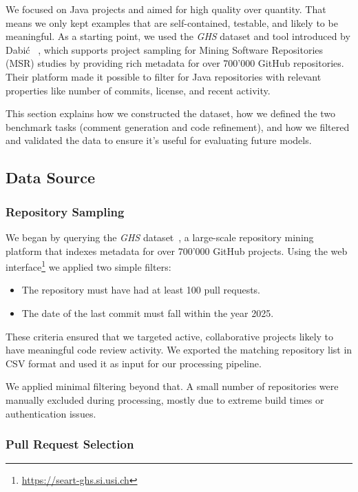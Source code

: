 We focused on Java projects and aimed for high quality over quantity. That means we only kept
examples that are self-contained, testable, and likely to be meaningful. As a starting point, we
used the \textit{GHS} dataset and tool introduced by Dabić \etal~\cite{Dabic:msr2021data}, which
supports project sampling for Mining Software Repositories (MSR) studies by providing rich metadata
for over 700'000 GitHub repositories. Their platform made it possible to filter for Java
repositories with relevant properties like number of commits, license, and recent activity.

This section explains how we constructed the dataset, how we defined the two benchmark tasks
(comment generation and code refinement), and how we filtered and validated the data to ensure it’s
useful for evaluating future models.


\subsection{Data Source}

\subsubsection{Repository Sampling}

We began by querying the \textit{GHS} dataset~\cite{Dabic:msr2021data}, a large-scale repository
mining platform that indexes metadata for over 700'000 GitHub projects. Using the web
interface\footnote{\url{https://seart-ghs.si.usi.ch}} we applied two simple filters:

\begin{itemize}
	\item The repository must have had at least 100 pull requests.
	\item The date of the last commit must fall within the year 2025.
\end{itemize}

These criteria ensured that we targeted active, collaborative projects likely to have meaningful
code review activity. We exported the matching repository list in CSV format and used it as input
for our processing pipeline.

We applied minimal filtering beyond that. A small number of repositories were manually excluded
during processing, mostly due to extreme build times or authentication issues.

\subsubsection{Pull Request Selection}
\label{sec:pr-selection}

